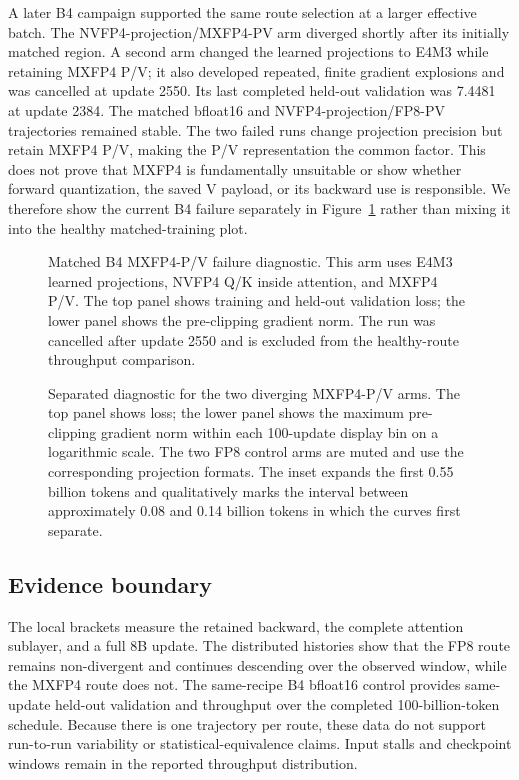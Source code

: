 A later B4 campaign supported the same route selection at a larger effective
batch.  The NVFP4-projection/MXFP4-PV arm diverged shortly after its initially
matched region.  A second arm changed the learned projections to E4M3 while
retaining MXFP4 P/V; it also developed repeated, finite gradient explosions
and was cancelled at update 2550.  Its last completed held-out validation was
7.4481 at update 2384.  The matched bfloat16 and
NVFP4-projection/FP8-PV trajectories remained stable.  The two failed runs
change projection precision but retain MXFP4 P/V, making the P/V
representation the common factor.  This does not prove that MXFP4 is
fundamentally unsuitable or show whether forward quantization, the saved V
payload, or its backward use is responsible.  We therefore show the current
B4 failure separately in Figure~\ref{fig:llama8b-b4-mxfp4-failure} rather than
mixing it into the healthy matched-training plot.

\begin{figure}[p]
\centering
{}
\caption{Matched B4 MXFP4-P/V failure diagnostic.  This arm uses E4M3 learned
projections, NVFP4 Q/K inside attention, and MXFP4 P/V.  The top panel shows
training and held-out validation loss; the lower panel shows the pre-clipping
gradient norm.  The run was cancelled after update 2550 and is excluded from
the healthy-route throughput comparison.}
\label{fig:llama8b-b4-mxfp4-failure}
\end{figure}

\begin{figure}[p]
\centering
{}
\caption{Separated diagnostic for the two diverging MXFP4-P/V arms.  The top
panel shows loss; the lower panel shows the maximum pre-clipping gradient norm
within each 100-update display bin on a logarithmic scale.  The two FP8
control arms are muted and use the corresponding projection formats.  The
inset expands the first 0.55 billion tokens and qualitatively marks the
interval between approximately 0.08 and 0.14 billion tokens in which the
curves first separate.}
\label{fig:llama8b-mxfp4-divergence}
\end{figure}
\FloatBarrier

\subsection{Evidence boundary}

The local brackets measure the retained backward, the complete attention
sublayer, and a full 8B update.  The distributed histories show that the FP8
route remains non-divergent and continues descending over the observed window,
while the MXFP4 route does not.  The same-recipe B4 bfloat16 control provides
same-update held-out validation and throughput over the completed
100-billion-token schedule.
Because there is one trajectory per route, these data do not support
run-to-run variability or statistical-equivalence claims.  Input stalls and
checkpoint windows remain in the reported throughput distribution.
